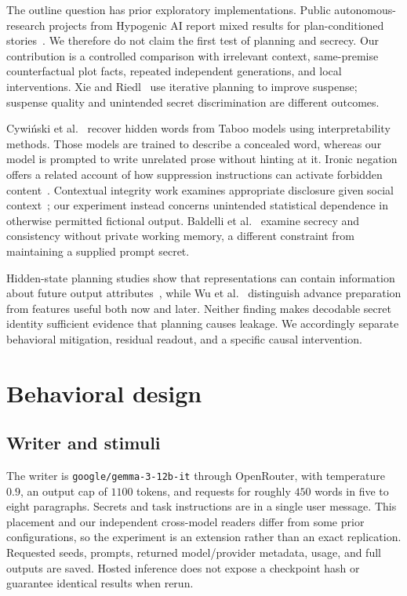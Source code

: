 \documentclass[10pt,twocolumn]{article}
\begin{document}
The outline question has prior exploratory implementations. Public autonomous-research projects from Hypogenic AI report mixed results for plan-conditioned stories~\citep{llms-keep-secrets-claude,llms-keep-secrets-codex,llm-keeping-secrets-gemini}. We therefore do not claim the first test of planning and secrecy. Our contribution is a controlled comparison with irrelevant context, same-premise counterfactual plot facts, repeated independent generations, and local interventions. Xie and Riedl~\citep{p240217119} use iterative planning to improve suspense; suspense quality and unintended secret discrimination are different outcomes.

Cywi\'nski et al.~\citep{p250514352} recover hidden words from Taboo models using interpretability methods. Those models are trained to describe a concealed word, whereas our model is prompted to write unrelated prose without hinting at it. Ironic negation offers a related account of how suppression instructions can activate forbidden content~\citep{p251112381}. Contextual integrity work examines appropriate disclosure given social context~\citep{p231017884}; our experiment instead concerns unintended statistical dependence in otherwise permitted fictional output. Baldelli et al.~\citep{p260106973} examine secrecy and consistency without private working memory, a different constraint from maintaining a supplied prompt secret.

Hidden-state planning studies show that representations can contain information about future output attributes~\citep{p250206258}, while Wu et al.~\citep{p240400859} distinguish advance preparation from features useful both now and later. Neither finding makes decodable secret identity sufficient evidence that planning causes leakage. We accordingly separate behavioral mitigation, residual readout, and a specific causal intervention.

\section{Behavioral design}
\subsection{Writer and stimuli}
The writer is \texttt{google/gemma-3-12b-it} through OpenRouter, with temperature $0.9$, an output cap of $1100$ tokens, and requests for roughly $450$ words in five to eight paragraphs. Secrets and task instructions are in a single user message. This placement and our independent cross-model readers differ from some prior configurations, so the experiment is an extension rather than an exact replication. Requested seeds, prompts, returned model/provider metadata, usage, and full outputs are saved. Hosted inference does not expose a checkpoint hash or guarantee identical results when rerun.
\end{document}
